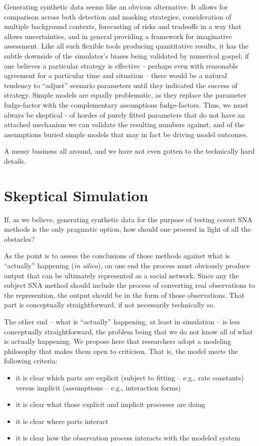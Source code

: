 \documentclass{article}
\begin{document}
Generating synthetic data seems like an obvious alternative.  It allows for comparison across both detection and masking strategies, consideration of multiple background contexts, forecasting of risks and tradeoffs in a way that allows uncertainties, and in general providing a framework for imaginative assessment.  Like all such flexible tools producing quantitative results, it has the subtle downside of the simulator's biases being validated by numerical gospel; if one believes a particular strategy is effective -- perhaps even with reasonable agreement for a particular time and situation -- there would be a natural tendency to ``adjust'' scenario parameters until they indicated the success of strategy.  Simple models are equally problematic, as they replace the parameter fudge-factor with the complementary assumptions fudge-factors.  Thus, we must always be skeptical - of hordes of purely fitted parameters that do not have an attached mechanism we can validate the resulting numbers against, and of the assumptions buried simple models that may in fact be driving model outcomes.

A messy business all around, and we have not even gotten to the technically hard details.

\section*{Skeptical Simulation}
If, as we believe, generating synthetic data for the purpose of testing covert SNA methods is the only pragmatic option, how should one proceed in light of all the obstacles?

As the point is to assess the conclusions of those methods against what is ``actually'' happening ({\em in silico}), on one end the process must obviously produce output that can be ultimately represented as a social network.  Since any the subject SNA method should include the process of converting real observations to the represention, the output should be in the form of those observations.  That part is conceptually straightforward, if not necessarily technically so.

The other end -- what is ``actually'' happening, at least in simulation -- is less conceptually straightforward, the problem being that we do not know all of what is actually happening.  We propose here that researchers adopt a modeling philosophy that makes them open to criticism.  That is, the model meets the following criteria:
\begin{itemize}
\item it is clear which parts are explicit (subject to fitting -- e.g., rate constants) versus implicit (assumptions -- e.g., interaction forms)
\item it is clear what those explicit and implicit processes are doing
\item it is clear where parts interact
\item it is clear how the observation process interacts with the modeled system
\end{itemize}
\end{document}
